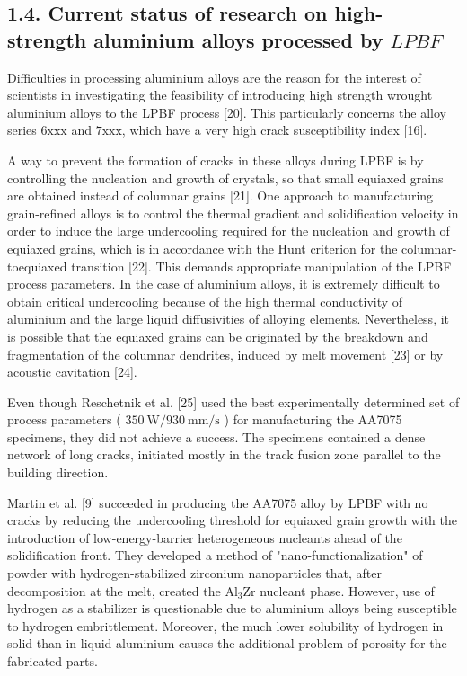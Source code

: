 \documentclass[10pt]{article}
\begin{document}
\subsection*{1.4. Current status of research on high-strength aluminium alloys processed by $L P B F$}
Difficulties in processing aluminium alloys are the reason for the interest of scientists in investigating the feasibility of introducing high strength wrought aluminium alloys to the LPBF process [20]. This particularly concerns the alloy series $6 \mathrm{xxx}$ and $7 \mathrm{xxx}$, which have a very high crack susceptibility index [16].

A way to prevent the formation of cracks in these alloys during LPBF is by controlling the nucleation and growth of crystals, so that small equiaxed grains are obtained instead of columnar grains [21]. One approach to manufacturing grain-refined alloys is to control the thermal gradient and solidification velocity in order to induce the large undercooling required for the nucleation and growth of equiaxed grains, which is in accordance with the Hunt criterion for the columnar-toequiaxed transition [22]. This demands appropriate manipulation of the LPBF process parameters. In the case of aluminium alloys, it is extremely difficult to obtain critical undercooling because of the high thermal conductivity of aluminium and the large liquid diffusivities of alloying elements. Nevertheless, it is possible that the equiaxed grains can be originated by the breakdown and fragmentation of the columnar dendrites, induced by melt movement [23] or by acoustic cavitation [24].

Even though Reschetnik et al. [25] used the best experimentally determined set of process parameters ( $350 \mathrm{~W} / 930 \mathrm{~mm} / \mathrm{s}$ ) for manufacturing the AA7075 specimens, they did not achieve a success. The specimens contained a dense network of long cracks, initiated mostly in the track fusion zone parallel to the building direction.

Martin et al. [9] succeeded in producing the AA7075 alloy by LPBF with no cracks by reducing the undercooling threshold for equiaxed grain growth with the introduction of low-energy-barrier heterogeneous nucleants ahead of the solidification front. They developed a method of "nano-functionalization" of powder with hydrogen-stabilized zirconium nanoparticles that, after decomposition at the melt, created the $\mathrm{Al}_{3} \mathrm{Zr}$ nucleant phase. However, use of hydrogen as a stabilizer is questionable due to aluminium alloys being susceptible to hydrogen embrittlement. Moreover, the much lower solubility of hydrogen in solid than in liquid aluminium causes the additional problem of porosity for the fabricated parts.
\end{document}
